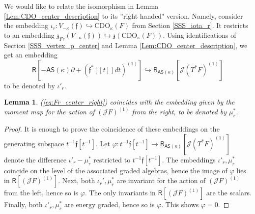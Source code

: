 \documentclass{amsart}
\newtheorem{Lem}[Thm]{Lemma}
\theoremstyle{definition}
\newcommand{\sss}{\subsubsection{}}
\newcommand{\Ring}{\mathsf{R}}
\newcommand{\Jet}{\mathscr{J}}
\newcommand{\ff}{\mathfrak{f}}
\newcommand{\AS}{\mathsf{AS}}
\newcommand{\CDO}{\mathrm{CDO}}
\newcommand{\frz}{\mathfrak{z}}
\numberwithin{equation}{section}
\begin{document}
\subsubsection{} We would like to relate the isomorphism in Lemma \ref{Lem:CDO_center_description} to its ''right handed" version. Namely, consider 
the embedding $\iota_r:V_{-\kappa}(\ff)\hookrightarrow \CDO_\kappa(F)$ from Section \ref{SSS_iota_r}. It restricts to an embedding $\mathfrak{z}_{Fr}(V_{-\kappa}(\ff))\hookrightarrow \mathfrak{z}(\CDO_\kappa(F))$. Using identifications of 
Section \ref{SSS_vertex_p_center} and 
Lemma \ref{Lem:CDO_center_description}, we get an embedding 
\begin{equation}\label{eq:Fr_center_right}
\Ring[-\AS(\kappa)\partial+(\ff^*[[t]]dt)^{(1)}]\hookrightarrow \Ring_{\AS(\kappa)}[\Jet(T^*F)^{(1)}]
\end{equation}
to be denoted by $\iota'_r$.

\begin{Lem}\label{Lem:Fr_center_right}
(\ref{eq:Fr_center_right}) coincides with the embedding given by the moment map for the action of $(\Jet F)^{(1)}$ from the right, to be denoted by $\mu_r^*$.
\end{Lem}
\begin{proof}
It is enough to prove the coincidence of these embeddings on the generating subspace
$t^{-1}\ff[t^{-1}]$. Let $\varphi: t^{-1}\ff[t^{-1}]\rightarrow \Ring_{\AS(\kappa)}[\Jet(T^*F)^{(1)}]$ denote the difference $\iota'_r-\mu_r^*$ restricted to $t^{-1}\ff[t^{-1}]$. The embeddings $\iota'_r,\mu_r^*$ coincide on the level of the associated graded algebras, hence the image of $\varphi$ lies in $\Ring[(\Jet F)^{(1)}]$.
Next, both $\iota_r',\mu_r^*$ are invariant for the action of $(\Jet F)^{(1)}$ from the left, hence so is $\varphi$. The only invariants in
$\Ring[(\Jet F)^{(1)}]$ are the scalars. Finally, both $\iota'_r,\mu_r^*$ are energy graded, hence so is $\varphi$. This shows $\varphi=0$.
\end{proof}


\end{document}
